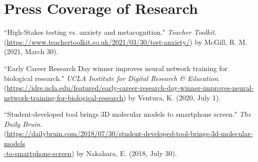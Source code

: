 \section*{Press Coverage of Research}
``High-Stakes testing vs. anxiety and metacognition." \textit{Teacher Toolkit}. \\ (\textcolor{RoyalBlue}{\href{https://www.teachertoolkit.co.uk/2021/03/30/test-anxiety/}{https://www.teachertoolkit.co.uk/2021/03/30/test-anxiety/}}) by McGill, R. M. (2021, March 30).

\pubspace

``Early Career Research Day winner improves neural network training for biological research." \textit{UCLA Institute for Digital Research \& Education}. (\textcolor{RoyalBlue}{\href{https://idre.ucla.edu/featured/early-career-research-day-winner-improves-neural-network-training-for-biological-research}{https://idre.ucla.edu/featured/early-career-research-day-winner-improves-neural-network-training-for-biological-research}}) by Ventura, K. (2020, July 1).

\pubspace

``Student-developed tool brings 3D molecular models to smartphone screen." \textit{The Daily Bruin}. \\ (\textcolor{RoyalBlue}{\href{https://dailybruin.com/2018/07/30/student-developed-tool-brings-3d-molecular-models-to-smartphone-screen}{https://dailybruin.com/2018/07/30/student-developed-tool-brings-3d-molecular-models \\ -to-smartphone-screen}}) by Nakahara, E. (2018, July 30).